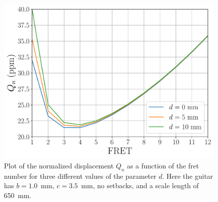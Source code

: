  \begin{figure}
  \centering
  \includegraphics[width=6.0in]{figures/fret_model}
  \caption{\label{fig:fret_model} Plot of the normalized displacement $Q_n$ as a function of the fret number for three different values of the parameter $d$. Here the guitar has $b = 1.0$~mm, $c = 3.5$~mm, no setbacks, and a scale length of 650~mm.}
 \end{figure}



